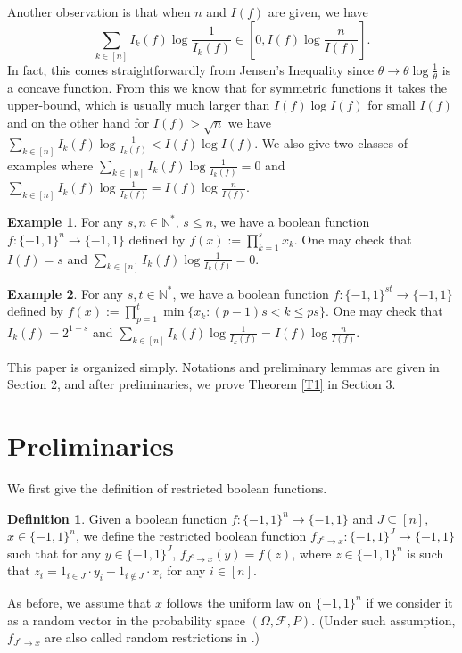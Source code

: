 \documentclass[10pt]{article} \usepackage[utf8]{inputenc}
\theoremstyle{definition}
\newtheorem{defn}[lem]{Definition}
\newtheorem{exmp}{Example}[section]
\theoremstyle{remark}
\numberwithin{equation}{section}
\begin{document}
Another observation is that when $n$ and $I(f)$ are given, we have
$$\sum\limits_{k\in [n]} I_k(f)\log \frac{1}{I_k(f)}\in [0, I(f)\log\frac{n}{I(f)}].$$
In fact, this comes straightforwardly from Jensen's Inequality since $\theta \to \theta \log \frac{1}{\theta}$ is a concave function. From this we know that for symmetric functions it takes the upper-bound, which is usually much larger than $I(f)\log I(f)$ for small $I(f)$ and on the other hand for $I(f)>\sqrt{n}$ we have $\sum\limits_{k\in [n]} I_k(f)\log \frac{1}{I_k(f)} < I(f)\log I(f)$. We also give two classes of examples where $\sum\limits_{k\in[n]} I_k(f)\log \frac{1}{I_k(f)} = 0$ and $\sum\limits_{k\in[n]} I_k(f)\log \frac{1}{I_k(f)} = I(f)\log\frac{n}{I(f)}$.
\begin{exmp}
For any $s, n \in \mathbb{N}^*$, $s\leq n$, we have a boolean function $f:\{-1, 1\}^n \to \{-1, 1\}$ defined by $f(x):=\prod\limits_{k=1}^{s}x_k$. One may check that $I(f)=s$ and $\sum\limits_{k\in[n]} I_k(f)\log \frac{1}{I_k(f)} = 0$.
\end{exmp}
\begin{exmp}
For any $s, t \in \mathbb{N}^*$, we have a boolean function $f:\{-1, 1\}^{st} \to \{-1, 1\}$ defined by $f(x):=\prod\limits_{p=1}^{t}\min\{x_k:(p-1)s< k\leq ps\}$. One may check that $I_k(f)=2^{1-s}$ and $\sum\limits_{k\in[n]} I_k(f)\log \frac{1}{I_k(f)} = I(f)\log\frac{n}{I(f)}$.
\end{exmp}

This paper is organized simply. Notations and preliminary lemmas are given in Section 2, and after preliminaries, we prove Theorem \ref{T1} in Section 3. 
\section{Preliminaries}
 We first give the definition of restricted boolean functions.
\begin{defn}
Given a boolean function $f:\{-1,1\}^n\to \{-1,1\}$ and $J\subseteq [n]$, $x\in \{-1,1\}^n$, we define the restricted boolean function $f_{J^c \to x}:\{-1,1\}^J \to \{-1,1\}$ such that for any $y\in \{-1,1\}^J$, $f_{J^c \to x}(y)=f(z)$, where $z\in \{-1,1\}^n$ is such that $z_i=1_{i\in J}\cdot y_i+1_{i\notin J}\cdot x_i$ for any $i\in [n]$.
\end{defn}
As before, we assume that $x$ follows the uniform law on $\{-1,1\}^n$ if we consider it as a random vector in the probability space $(\Omega, \mathcal{F}, P)$. (Under such assumption, $f_{J^c \to x}$ are also called random restrictions in \cite{1}.)
\end{document}
